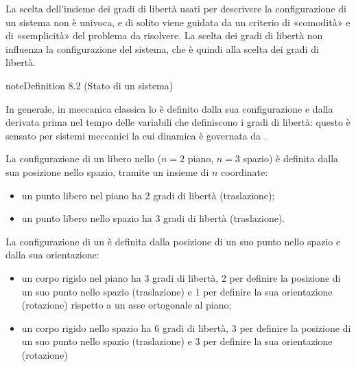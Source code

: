 \documentclass[letterpaper,10pt,italian]{jupyterBook}
\begin{document}
\sphinxAtStartPar
La scelta dell’insieme dei gradi di libertà usati per descrivere la configurazione di un sistema non è univoca, e di solito viene guidata da un criterio di «comodità» e di «semplicità» del problema da risolvere. La scelta dei gradi di libertà non influenza la configurazione del sistema, che è quindi  alla scelta dei gradi di libertà.
\label{ch/mechanics/kinematics:system-state}
\begin{sphinxadmonition}{note}{Definition 8.2 (Stato di un sistema)}



\sphinxAtStartPar
In generale, in meccanica classica lo  è definito dalla sua configurazione e dalla derivata prima nel tempo delle variabili che definiscono i gradi di libertà: questo è sensato per sistemi meccanici la cui dinamica è governata da .
\end{sphinxadmonition}

\sphinxAtStartPar
La configurazione di un  libero nello  (\(n=2\) piano, \(n=3\) spazio) è definita dalla sua posizione nello spazio, tramite un insieme di \(n\) coordinate:
\begin{itemize}
\item {} 
\sphinxAtStartPar
un punto libero nel piano ha 2 gradi di libertà (traslazione);

\item {} 
\sphinxAtStartPar
un punto libero nello spazio ha 3 gradi di libertà (traslazione).

\end{itemize}

\sphinxAtStartPar
La configurazione di un  è definita dalla posizione di un suo punto nello spazio e dalla sua orientazione:
\begin{itemize}
\item {} 
\sphinxAtStartPar
un corpo rigido nel piano ha 3 gradi di libertà, 2 per definire la posizione di un suo punto nello spazio (traslazione) e 1 per definire la sua orientazione (rotazione) rispetto a un asse ortogonale al piano;

\item {} 
\sphinxAtStartPar
un corpo rigido nello spazio ha 6 gradi di libertà, 3 per definire la posizione di un suo punto nello spazio (traslazione) e 3 per definire la sua orientazione (rotazione)

\end{itemize}
\end{document}
